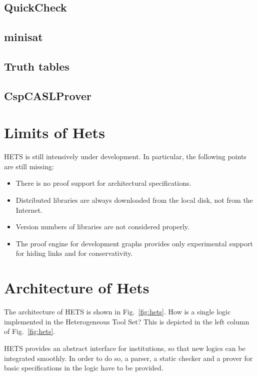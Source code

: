 \documentclass{article}
\newcommand{\normalTEXTSC}[2]{{#1\scriptsize#2}}
\newcommand     {\Hets}{\normalTEXTSC{H}{ETS}\xspace}
\begin{document}
\subsection{QuickCheck}
\subsection{minisat}
\subsection{Truth tables}
\subsection{CspCASLProver}

\section{Limits of Hets}

\Hets is still intensively under development. In particular, the
following points are still missing:

\begin{itemize}
\item There is no proof support for architectural specifications.
\item Distributed libraries are always downloaded from the local disk,
not from the Internet.
\item Version numbers of libraries are not considered properly.
\item The proof engine for development graphs provides only experimental
support for hiding links and for conservativity.
\end{itemize}


\section{Architecture of Hets}

The architecture of \Hets is shown in Fig.~\ref{fig:hets}.
How is a single logic implemented in the Heterogeneous Tool Set?
This is depicted in the left column of Fig.~\ref{fig:hets}.

\Hets provides an abstract interface for
institutions, so
that new logics can be integrated smoothly.
In order to do so, a parser,
a static checker and a prover for basic specifications in the logic have
to be provided.
\end{document}
